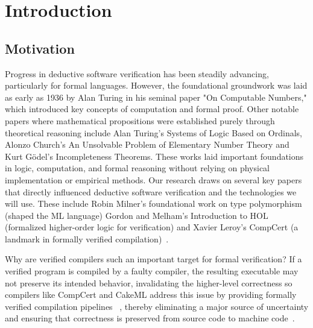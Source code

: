 
%

\chapter{Introduction}
\label{cha:introduction}


\section{Motivation}
\label{sec:Motivation}


Progress in deductive software verification has been steadily advancing, particularly for formal languages. 
However, the foundational groundwork was laid as early as 1936 by Alan Turing in his seminal paper "On Computable Numbers," 
which introduced key concepts of computation and formal proof. Other notable papers where mathematical propositions were 
established purely through theoretical reasoning include Alan Turing's Systems of Logic Based on Ordinals, Alonzo Church's 
An Unsolvable Problem of Elementary Number Theory and Kurt Gödel's Incompleteness Theorems. These works laid important 
foundations in logic, computation, and formal reasoning without relying on physical implementation or empirical methods.
Our research draws on several key papers that directly influenced deductive software verification and the technologies 
we will use. These include Robin Milner's foundational work on type polymorphism (shaped the ML language) Gordon and 
Melham's Introduction to HOL (formalized higher-order logic for verification) and Xavier Leroy's CompCert (a landmark 
in formally verified compilation)~\cite{Turing37, Turing38}. 


Why are verified compilers such an important target for formal verification? If a verified program is compiled by a 
faulty compiler, the resulting executable may not preserve its intended behavior, invalidating the higher-level correctness 
so compilers like CompCert and CakeML address this issue by providing formally verified compilation pipelines
~\cite{LoowKTMNAF19, GrossEPPC22, Leroy09}, thereby eliminating a major source of uncertainty and ensuring that correctness is 
preserved from source code to machine code~\cite{LeroyCompilerMeaning}.

